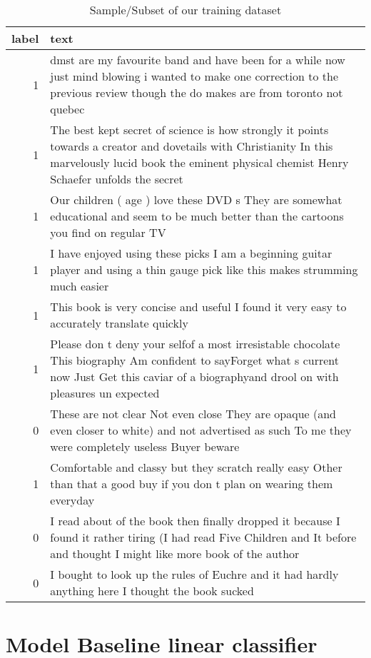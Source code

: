 \documentclass[
]{article}
\begin{document}
\begin{table}

\caption{\label{tab:subset_train}Sample/Subset of our training dataset\label{tbl:amazon_subset_train}}
\centering
\begin{tabular}[t]{rl}
\toprule
label & text\\
\midrule
1 & dmst are my favourite band and have been for a while now just mind blowing i wanted to make one correction to the previous review though the do makes are from toronto not quebec\\
1 & The best kept secret of science is how strongly it points towards a creator and dovetails with Christianity In this marvelously lucid book the eminent physical chemist Henry Schaefer unfolds the secret\\
1 & Our children ( age ) love these DVD s They are somewhat educational and seem to be much better than the cartoons you find on regular TV\\
1 & I have enjoyed using these picks I am a beginning guitar player and using a thin gauge pick like this makes strumming much easier\\
1 & This book is very concise and useful I found it very easy to accurately translate quickly\\
1 & Please don t deny your selfof a most irresistable chocolate This biography Am confident to sayForget what s current now Just Get this caviar of a biographyand drool on with pleasures un expected\\
0 & These are not clear Not even close They are opaque (and even closer to white) and not advertised as such To me they were completely useless Buyer beware\\
1 & Comfortable and classy but they scratch really easy Other than that a good buy if you don t plan on wearing them everyday\\
0 & I read about of the book then finally dropped it because I found it rather tiring (I had read Five Children and It before and thought I might like more book of the author\\
0 & I bought to look up the rules of Euchre and it had hardly anything here I thought the book sucked\\
\bottomrule
\end{tabular}
\end{table}

\newpage

\hypertarget{model-baseline-linear-classifier}{%
\section{Model Baseline linear
classifier}\label{model-baseline-linear-classifier}}
\end{document}
